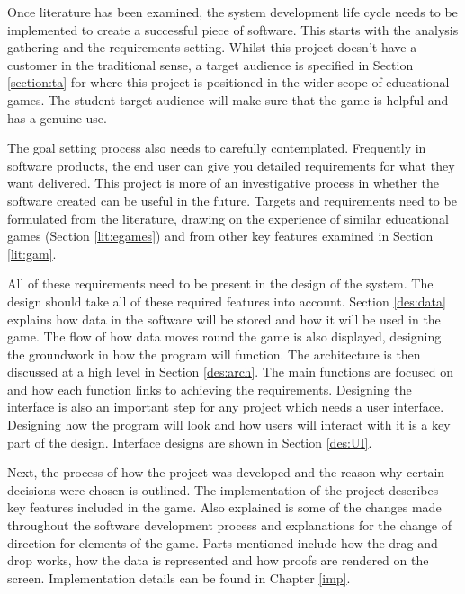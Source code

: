 \documentclass[FYP.tex]{subfiles}
\begin{document}

Once literature has been examined, the system development life cycle needs to be implemented to create a successful piece of software. This starts with the analysis gathering and the requirements setting. Whilst this project doesn't have a customer in the traditional sense, a target audience is specified in Section \ref{section:ta} for where this project is positioned in the wider scope of educational games. The student target audience will make sure that the game is helpful and has a genuine use.

The goal setting process also needs to carefully contemplated. Frequently in software products, the end user can give you detailed requirements for what they want delivered. This project is more of an investigative process in whether the software created can be useful in the future. Targets and requirements need to be formulated from the literature, drawing on the experience of similar educational games (Section \ref{lit:egames}) and from other key features examined in Section \ref{lit:gam}.


All of these requirements need to be present in the design of the system. The design should take all of these required features into account. Section \ref{des:data} explains how data in the software will be stored and how it will be used in the game. The flow of how data moves round the game is also displayed, designing the groundwork in how the program will function. The architecture is then discussed at a high level in Section \ref{des:arch}. The main functions are focused on and how each function links to achieving the requirements. Designing the interface is also an important step for any project which needs a user interface. Designing how the program will look and how users will interact with it is a key part of the design. Interface designs are shown in Section \ref{des:UI}. 


Next, the process of how the project was developed and the reason why certain decisions were chosen is outlined. The implementation of the project describes key features included in the game.  Also explained is some of the changes made throughout the software development process and explanations for the change of direction for elements of the game. Parts mentioned include how the drag and drop works, how the data is represented and how proofs are rendered on the screen. Implementation details can be found in Chapter \ref{imp}.
\end{document}
